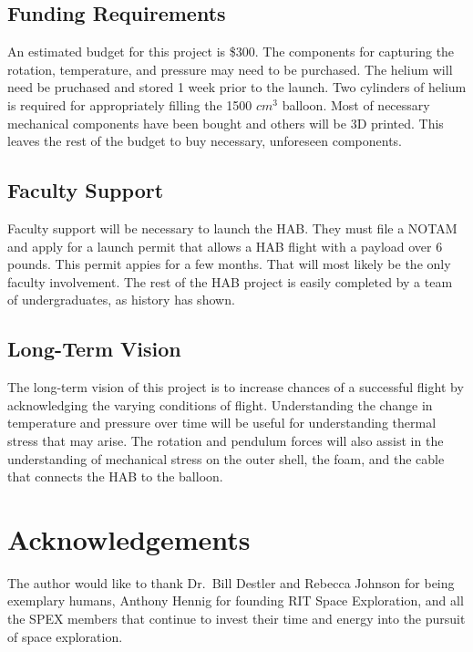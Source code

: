 \documentclass[conference]{IEEEtran} %
\begin{document}
\subsection{Funding Requirements}
An estimated budget for this project is \$300. The components for capturing the rotation, temperature, and pressure may need to be purchased. The
helium will need be pruchased and stored 1 week prior to the launch. Two cylinders of helium is required for appropriately filling the 1500 \(cm^3\) balloon.
Most of necessary mechanical components have been bought and others will be 3D printed. This leaves the rest of the budget to buy necessary, unforeseen components.

\subsection{Faculty Support}
Faculty support will be necessary to launch the HAB. They must file a NOTAM and apply for a launch permit that allows a HAB flight with a payload over 6 pounds. This permit
appies for a few months. That will most likely be the only faculty involvement. The rest of the HAB project is easily completed by a team of undergraduates, as history has shown.

\subsection{Long-Term Vision}
\label{sec:vision}
The long-term vision of this project is to increase chances of a successful flight by acknowledging the varying conditions of flight. Understanding the change in temperature and pressure over time
will be useful for understanding thermal stress that may arise. The rotation and pendulum forces will also assist in the understanding of mechanical stress on the outer shell, the foam,
and the cable that connects the HAB to the balloon. 

\section*{Acknowledgements}
The author would like to thank Dr.~Bill Destler and Rebecca Johnson for being exemplary humans, Anthony Hennig for founding RIT Space Exploration, and all the SPEX members that continue to invest their time and energy into the pursuit of space exploration.

\onecolumn
\appendices{}
\end{document}
